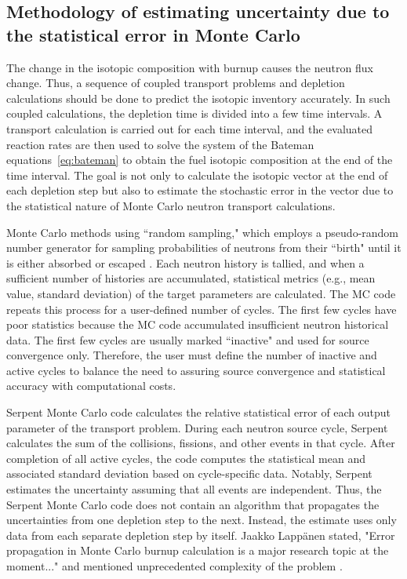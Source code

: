 \subsection{Methodology of estimating uncertainty due to the statistical error 
in Monte Carlo}
The change in the isotopic composition with burnup causes the neutron flux 
change. Thus, a sequence of coupled transport problems and depletion 
calculations should be done to predict the isotopic inventory accurately. In 
such coupled calculations, the depletion time is divided into a few time 
intervals. A transport calculation is carried out for each time interval, and 
the evaluated reaction rates are then used to solve the system of the Bateman 
equations~\ref{eq:bateman} to obtain the fuel isotopic composition at the end 
of the time interval. The goal is not only to calculate the isotopic vector at 
the end of each depletion step but also to estimate the stochastic error in 
the vector due to the statistical nature of Monte Carlo neutron transport 
calculations.

Monte Carlo methods using ``random sampling," which employs a pseudo-random 
number generator for sampling probabilities of neutrons from their ``birth" 
until it is either absorbed or escaped \cite{brown_fundamentals_2005}. Each 
neutron history is tallied, and when a sufficient number of histories are 
accumulated, statistical metrics (e.g., mean value, standard deviation) of the 
target parameters are calculated. The \gls{MC} code repeats this process for a
user-defined number of cycles. The first few cycles have poor statistics 
because the \gls{MC} code accumulated insufficient neutron historical data. 
The first few cycles are usually marked ``inactive" and used for source 
convergence only. Therefore, the user must define the number of inactive and 
active cycles to balance the need to assuring source convergence and 
statistical accuracy with computational costs.

Serpent Monte Carlo code calculates the relative statistical error of each 
output parameter of the transport problem. 
During each neutron source cycle, Serpent calculates the sum of the 
collisions, fissions, and other events in that cycle. After completion of all 
active cycles, the code computes the statistical mean and associated standard 
deviation based on cycle-specific data. Notably, Serpent estimates the 
uncertainty assuming that all events are independent. Thus, the Serpent Monte 
Carlo code does not contain an algorithm that propagates the uncertainties 
from one depletion step to the next. Instead, the estimate uses only data from 
each separate depletion step by itself. Jaakko Lapp\"{a}nen stated, "Error 
propagation in Monte Carlo burnup calculation is a major research topic at the 
moment..." and mentioned unprecedented complexity of the problem 
\cite{leppanen_statistical_2012}.

